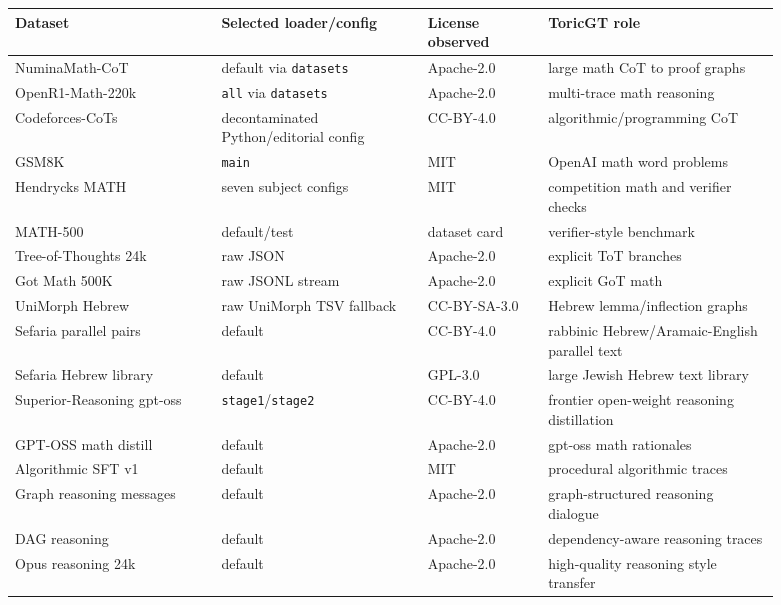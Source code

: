 \documentclass[11pt]{article}
\theoremstyle{definition}
\theoremstyle{plain}
\theoremstyle{remark}
\numberwithin{equation}{section}
\begin{document}
{\small
\begin{longtable}{>{\raggedright\arraybackslash}p{0.24\linewidth}>{\raggedright\arraybackslash}p{0.24\linewidth}>{\raggedright\arraybackslash}p{0.14\linewidth}>{\raggedright\arraybackslash}p{0.27\linewidth}}
\toprule
Dataset & Selected loader/config & License observed & ToricGT role \\
\midrule
\endhead
NuminaMath-CoT & default via \texttt{datasets} & Apache-2.0 & large math CoT to proof graphs \\
OpenR1-Math-220k & \texttt{all} via \texttt{datasets} & Apache-2.0 & multi-trace math reasoning \\
Codeforces-CoTs & decontaminated Python/editorial config & CC-BY-4.0 & algorithmic/programming CoT \\
GSM8K & \texttt{main} & MIT & OpenAI math word problems \\
Hendrycks MATH & seven subject configs & MIT & competition math and verifier checks \\
MATH-500 & default/test & dataset card & verifier-style benchmark \\
Tree-of-Thoughts 24k & raw JSON & Apache-2.0 & explicit ToT branches \\
Got Math 500K & raw JSONL stream & Apache-2.0 & explicit GoT math \\
UniMorph Hebrew & raw UniMorph TSV fallback & CC-BY-SA-3.0 & Hebrew lemma/inflection graphs \\
Sefaria parallel pairs & default & CC-BY-4.0 & rabbinic Hebrew/Aramaic-English parallel text \\
Sefaria Hebrew library & default & GPL-3.0 & large Jewish Hebrew text library \\
Superior-Reasoning gpt-oss & \texttt{stage1}/\texttt{stage2} & CC-BY-4.0 & frontier open-weight reasoning distillation \\
GPT-OSS math distill & default & Apache-2.0 & gpt-oss math rationales \\
Algorithmic SFT v1 & default & MIT & procedural algorithmic traces \\
Graph reasoning messages & default & Apache-2.0 & graph-structured reasoning dialogue \\
DAG reasoning & default & Apache-2.0 & dependency-aware reasoning traces \\
Opus reasoning 24k & default & Apache-2.0 & high-quality reasoning style transfer \\
\bottomrule
\end{longtable}
}
\end{document}
